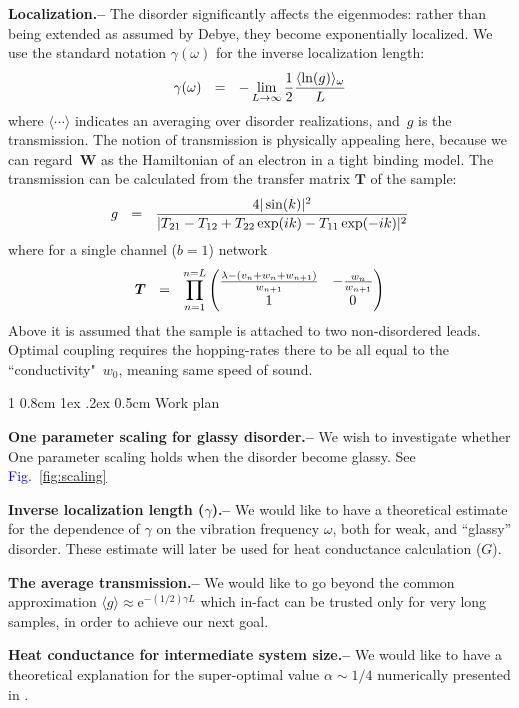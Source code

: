 \documentclass[onecolumn,fleqn,notitlepage,secnumarabic]{revtex4}
\makeatletter
\newcommand{\Fig}[1]{\textcolor{blue}{Fig.}\!\!~\ref{#1}}
\newcommand{\eexp}{\mbox{e}^}
\newcommand{\amatrix}[1]{\begin{matrix} #1 \end{matrix}}
\newcommand{\be}[1]{\begin{eqnarray}\ifthenelse{#1=-1}{\nonumber}{\ifthenelse{#1=0}{}{\label{e#1}}}}
\newcommand{\ee}{\end{eqnarray}}
\newcommand{\beq}{\be{1}}
\newcommand{\eeq}{\ee}
\newcommand{\sect}[1]{{\bf #1.-- }}
\def\section{%
  \@startsection
    {section}%
    {1}%
    {\z@}%
    {0.8cm \@plus1ex \@minus .2ex}%
    {0.5cm}%
    {\Large\bf }%
}%
\makeatother
\begin{document}
\sect{Localization}
%
The disorder significantly affects the eigenmodes: rather than being extended 
as assumed by Debye, they become exponentially localized. 
We use the standard notation $\gamma(\omega)$ for the inverse localization length: 
%
\beq
\label{eq:locdef}
\gamma(\omega) \ \ = \ \ -\lim_{L\rightarrow \infty}{1\over 2}{\langle \ln(g) \rangle_{\omega} \over L}
\eeq
%
where $\langle\cdots\rangle$ indicates an averaging over disorder realizations, 
and~$g$ is the transmission. The notion of transmission is physically appealing here,  
because we can regard~$\bm{W}$ as the Hamiltonian of an electron in a tight binding model. 
The transmission can be calculated from the transfer matrix $\bm{T}$ of the sample:
%
\beq
\label{eq:gTMM}
g \ \ = \ \ \frac{4|\sin(k)|^2}{|T_{21}-T_{12}+T_{22}\exp(ik)-T_{11}\exp(-ik)|^2}
\eeq
%
where for a single channel ($b=1$) network
%
\be{5}\label{eq:TM}
\bm{T} \ \ = \ \ \prod_{n=1}^{n=L} 
\left(\amatrix{
\frac{\lambda-(v_n + w_{n}+w_{n+1})}{w_{n+1}} & -\frac{w_{n}}{w_{n+1}} \cr 1 & 0 
}\right)
\eeq
%
Above it is assumed that the sample is attached to two non-disordered leads.
Optimal coupling requires the hopping-rates there to be all equal 
to the ``conductivity"~$w_0$, meaning same speed of sound. 



\section{Work plan}

\sect{One parameter scaling for glassy disorder}
We wish to investigate whether One parameter scaling holds when the disorder become glassy. See \Fig{fig:scaling}

\sect{Inverse localization length ($\gamma$)}
We would like to have a theoretical estimate for the dependence of $\gamma$ on the vibration frequency $\omega$,  both for weak, and ``glassy'' disorder. These estimate will later be used for heat conductance calculation ($G$).

\sect{The average transmission} We would like to go beyond the common approximation ${ \langle g \rangle \approx \eexp{-(1/2)\gamma L}}$ which in-fact can be trusted 
only for very long samples, in order to achieve our next goal.

\sect{Heat conductance for intermediate system size}
We would like to have a theoretical explanation for the super-optimal value $\alpha \sim 1/4$ numerically presented in \cite{BZFK13}.
\end{document}
